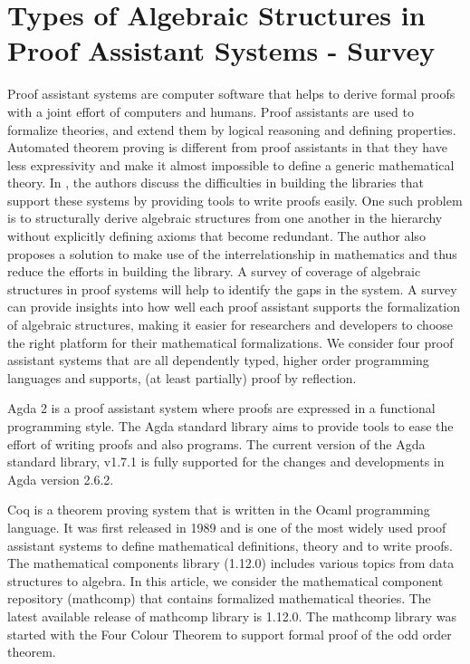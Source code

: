 \chapter{Types of Algebraic Structures in Proof Assistant Systems - Survey}

Proof assistant systems are computer software that helps to derive formal proofs
with a joint effort of computers and humans. Proof assistants are used to
formalize theories, and extend them by logical reasoning and defining
properties\cite{2019arXiv191203028S}. Automated theorem proving is different
from proof assistants in that they have less expressivity and make it almost
impossible to define a generic mathematical theory. In \cite{BuildingDiamond},
the authors discuss the difficulties in building the libraries that support
these systems by providing tools to write proofs easily. One such problem is to
structurally derive algebraic structures from one another in the hierarchy
without explicitly defining axioms that become redundant. The author also
proposes a solution to make use of the interrelationship in mathematics and thus
reduce the efforts in building the library. A survey of coverage of algebraic
structures in proof systems will help to identify the gaps in the system. A
survey can provide insights into how well each proof assistant supports the
formalization of algebraic structures, making it easier for researchers and
developers to choose the right platform for their mathematical formalizations.
We consider four proof assistant systems that are all dependently typed, higher
order programming languages and supports, (at least partially) proof by
reflection.

Agda 2 is a proof assistant system where proofs are expressed in a functional
programming style. The Agda standard library aims to provide tools to ease the
effort of writing proofs and also programs. The current version of the Agda
standard library, v1.7.1 is fully supported for the changes and developments in
Agda version 2.6.2. 

Coq \cite{Paulin-Mohring2012} is a theorem proving system that is written in the
Ocaml programming language. It was first released in 1989 and is one of the most
widely used proof assistant systems to define mathematical definitions, theory
and to write proofs. The mathematical components library (1.12.0) includes
various topics from data structures to algebra. In this article, we consider the
mathematical component repository (mathcomp) that contains formalized
mathematical theories\cite{assia_mahboubi_2021_4457887}. The latest available
release of mathcomp library is 1.12.0. The mathcomp library was started with the
Four Colour Theorem to support formal proof of the odd order theorem. 

